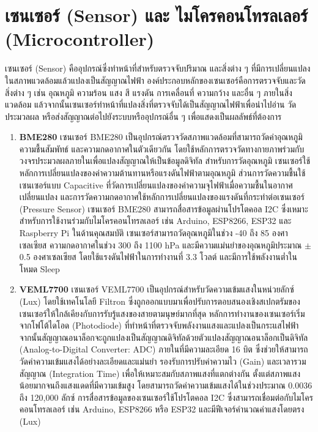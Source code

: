 \section{เซนเซอร์ (Sensor) และ ไมโครคอนโทรลเลอร์ (Microcontroller)}
\hspace{\parindent}เซนเซอร์ (Sensor) คืออุปกรณ์ซึ่งทำหน้าที่สำหรับตรวจจับปริมาณ และสิ่งต่าง ๆ ที่มีการเปลี่ยนแปลงในสภาพแวดล้อมแล้วแปลงเป็นสัญญาณไฟฟ้า องค์ประกอบหลักของเซนเซอร์คือการตรวจจับและวัดสิ่งต่าง ๆ เช่น อุณหภูมิ ความร้อน แสง สี แรงดัน การเคลื่อนที่ ความกว้าง และอื่น ๆ ภายในสิ่งแวดล้อม แล้วจากนั้นเซนเซอร์ทำหน้าที่แปลงสิ่งที่ตรวจจับได้เป็นสัญญาณไฟฟ้าเพื่อนำไปอ่าน วัด ประมวลผล หรือส่งสัญญาณต่อไปยังระบบหรืออุปกรณ์อื่น ๆ เพื่อแสดงเป็นผลลัพธ์ที่ต้องการ \cite{simtec_sensor}
\begin{enumerate}
\item \textbf{BME280}
เซนเซอร์ BME280 เป็นอุปกรณ์ตรวจวัดสภาพแวดล้อมที่สามารถวัดค่าอุณหภูมิ ความชื้นสัมพัทธ์ และความกดอากาศในตัวเดียวกัน โดยใช้หลักการตรวจวัดทางกายภาพร่วมกับวงจรประมวลผลภายในเพื่อแปลงสัญญาณให้เป็นข้อมูลดิจิทัล
สำหรับการวัดอุณหภูมิ เซนเซอร์ใช้หลักการเปลี่ยนแปลงของค่าความต้านทานหรือแรงดันไฟฟ้าตามอุณหภูมิ ส่วนการวัดความชื้นใช้เซนเซอร์แบบ Capacitive ที่วัดการเปลี่ยนแปลงของค่าความจุไฟฟ้าเมื่อความชื้นในอากาศเปลี่ยนแปลง และการวัดความกดอากาศใช้หลักการเปลี่ยนแปลงของแรงดันที่กระทำต่อเซนเซอร์ (Pressure Sensor)
เซนเซอร์ BME280 สามารถสื่อสารข้อมูลผ่านโปรโตคอล I2C ซึ่งเหมาะสำหรับการใช้งานร่วมกับไมโครคอนโทรลเลอร์ เช่น Arduino, ESP8266, ESP32 และ Raspberry Pi
ในด้านคุณสมบัติ เซนเซอร์สามารถวัดอุณหภูมิในช่วง -40 ถึง 85 องศาเซลเซียส ความกดอากาศในช่วง 300 ถึง 1100 hPa และมีความแม่นยำของอุณหภูมิประมาณ $\pm$0.5 องศาเซลเซียส โดยใช้แรงดันไฟฟ้าในการทำงานที่ 3.3 โวลต์ และมีการใช้พลังงานต่ำในโหมด Sleep \cite{allnewstep_bme280}\cite{redzero_bme280}

\item \textbf{VEML7700}
เซนเซอร์ VEML7700 เป็นอุปกรณ์สำหรับวัดความเข้มแสงในหน่วยลักซ์ (Lux) โดยใช้เทคโนโลยี Filtron ซึ่งถูกออกแบบมาเพื่อปรับการตอบสนองเชิงสเปกตรัมของเซนเซอร์ให้ใกล้เคียงกับการรับรู้แสงของสายตามนุษย์มากที่สุด
หลักการทำงานของเซนเซอร์เริ่มจากโฟโต้ไดโอด (Photodiode) ที่ทำหน้าที่ตรวจจับพลังงานแสงและแปลงเป็นกระแสไฟฟ้า จากนั้นสัญญาณอนาล็อกจะถูกแปลงเป็นสัญญาณดิจิทัลด้วยตัวแปลงสัญญาณอนาล็อกเป็นดิจิทัล (Analog-to-Digital Converter: ADC) ภายในที่มีความละเอียด 16 บิต ซึ่งช่วยให้สามารถวัดค่าความเข้มแสงได้อย่างละเอียดและแม่นยำ รองรับการปรับค่าความไว (Gain) และเวลารวมสัญญาณ (Integration Time) เพื่อให้เหมาะสมกับสภาพแสงที่แตกต่างกัน ตั้งแต่สภาพแสงน้อยมากจนถึงแสงแดดที่มีความเข้มสูง โดยสามารถวัดค่าความเข้มแสงได้ในช่วงประมาณ 0.0036 ถึง 120,000 ลักซ์
การสื่อสารข้อมูลของเซนเซอร์ใช้โปรโตคอล I2C ซึ่งสามารถเชื่อมต่อกับไมโครคอนโทรลเลอร์ เช่น Arduino, ESP8266 หรือ ESP32 และมีฟีเจอร์คำนวณค่าแสงโดยตรง (Lux)\cite{mouser_veml7700}


\end{enumerate}
